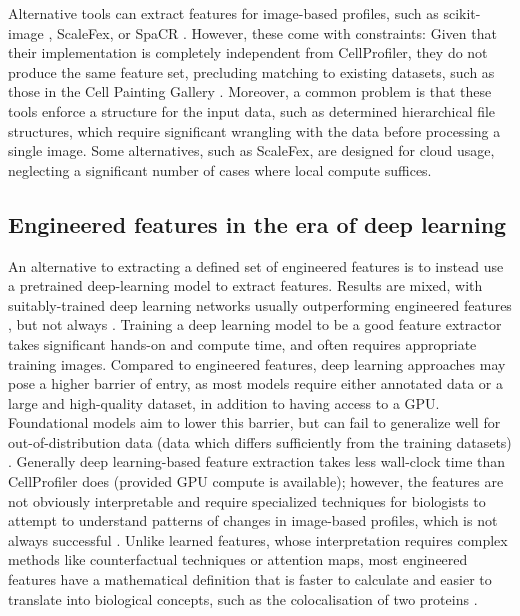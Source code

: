 \documentclass{article}
\begin{document}
Alternative tools can extract features for image-based profiles, such as scikit-image \citep{waltScikitimageImageProcessing2014}, ScaleFex, or SpaCR \citep{comoletHighlyEfficientScalable2024,einarolafssonSpaCr2025} . However, these come with constraints: Given that their implementation is completely independent from CellProfiler, they do not produce the same feature set, precluding matching to existing datasets, such as those in the Cell Painting Gallery \cite{weisbartCellPaintingGallery2024,fayRxRx3PhenomicsMap2023}. Moreover, a common problem is that these tools enforce a structure for the input data, such as determined hierarchical file structures, which require significant wrangling with the data before processing a single image. Some alternatives, such as ScaleFex, are designed for cloud usage, neglecting a significant number of cases where local compute suffices. 

\subsection{Engineered features in the era of deep learning}
\label{sec:org9dc3dfa}
An alternative to extracting a defined set of engineered features is to instead use a pretrained deep-learning model to extract features. Results are mixed, with suitably-trained deep learning networks usually outperforming engineered features \cite{lafargeCapturingSingleCellPhenotypic2019,moshkovLearningRepresentationsImagebased2022,chowPredictingDrugPolypharmacology2022,wolfSCANPYLargescaleSinglecell2018}, but not always \cite{tangMorphologicalProfilingDrug2024,kimSelfsupervisionAdvancesMorphological2023}. Training a deep learning model to be a good feature extractor takes significant hands-on and compute time, and often requires appropriate training images. Compared to engineered features, deep learning approaches may pose a higher barrier of entry, as most models require either annotated data or a large and high-quality dataset, in addition to having access to a GPU. Foundational models aim to lower this barrier, but can fail to generalize well for out-of-distribution data (data which differs sufficiently from the training datasets) \cite{azadFoundationalModelsMedical2023}. Generally deep learning-based feature extraction takes less wall-clock time than CellProfiler does (provided GPU compute is available); however, the features are not obviously interpretable and require specialized techniques for biologists to attempt to understand patterns of changes in image-based profiles, which is not always successful \citep{liChallengesOpportunitiesBioimage2023}.  Unlike learned features, whose interpretation requires complex methods like counterfactual techniques or attention maps, most engineered features have a mathematical definition that is faster to calculate and easier to translate into biological concepts, such as the colocalisation of two proteins \cite{garcia-fossaInterpretingImagebasedProfiles2023}.
\end{document}
